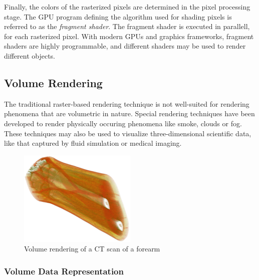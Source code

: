 \documentclass{article}
\begin{document}
Finally, the colors of the rasterized pixels are determined in the pixel processing stage.
The GPU program defining the algorithm used for shading pixels is referred to as the \textit{fragment shader}.
The fragment shader is executed in parallell, for each rasterized pixel. With modern GPUs and graphics frameworks, fragment shaders are highly programmable, and different shaders may be used to render different objects.

\subsection{Volume Rendering}
The traditional raster-based rendering technique is not well-suited for rendering phenomena that are volumetric in nature.
Special rendering techniques have been developed to render physically occuring phenomena like smoke, clouds or fog. These techniques
may also be used to visualize three-dimensional scientific data, like that captured by fluid simulation or medical imaging.

\begin{figure}[tbh]
    \centering
    \includegraphics[width=0.5\textwidth]{images/VolumeRendering.png}
    \caption{Volume rendering of a CT scan of a forearm}
    \label{fig:forearmCT}
\end{figure}

\subsubsection{Volume Data Representation}

\newpage
\end{document}
